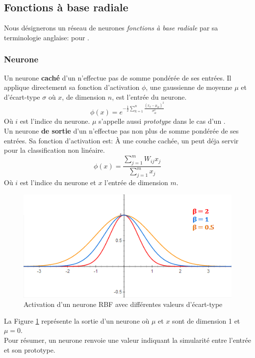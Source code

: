 \subsection{Fonctions à base radiale}
Nous désignerons un réseau de neurones \emph{fonctions à base radiale} par sa terminologie anglaise: \rbf pour .
\newcommand{\factnorm}{\sum_{r=1}^{m}x_{r}}
\subsubsection{Neurone}
Un neurone \textbf{caché} d'un \rbf n'effectue pas de somme pondérée de ses entrées.
Il applique directement sa fonction d'activation $\phi$, une gaussienne de moyenne $\mu$ et d'écart-type $\sigma$ où $x$, de dimension $n$, est l'entrée du neurone.
\begin{equation}\label{eq:cachephi}
 \phi(x) = e^{-\frac{1}{2}\sum_{k=1}^{n}\frac{(x_k-\mu_{ik})^2}{\sigma_{ik}^{2}}}
\end{equation}
Où $i$ est l'indice du neurone. $\mu$ s'appelle aussi \emph{prototype} dans le cas d'un \rbf.
\\

Un neurone \textbf{de sortie} d'un \rbf n'effectue pas non plus de somme pondérée de ses entrées. Sa fonction d'activation est:
À une couche cachée, un \mlp peut déja servir pour la classification non linéaire.\cite{statistica}\\
\begin{equation}\label{eq:sortiephi}
 \phi(x) = \frac{\sum_{j=1}^{m}W_{ij}x_{j}}{\sum_{j=1}^{m}x_{j}}
\end{equation}
Où $i$ est l'indice du neurone et $x$ l'entrée de dimension $m$.
\begin{figure}
 \centering
 \includegraphics[scale=0.7]{../figures/RBFactivation.png}%
 \caption{Activation d'un neurone RBF avec différentes valeurs d'écart-type}
 \label{rbfactivation}
\end{figure}
La Figure \ref{rbfactivation} représente la sortie d'un neurone \rbf où $\mu$ et $x$ sont de dimension 1 et $\mu = 0$.\\
Pour résumer, un neurone \rbf renvoie une valeur indiquant la simularité entre l'entrée et son prototype.
